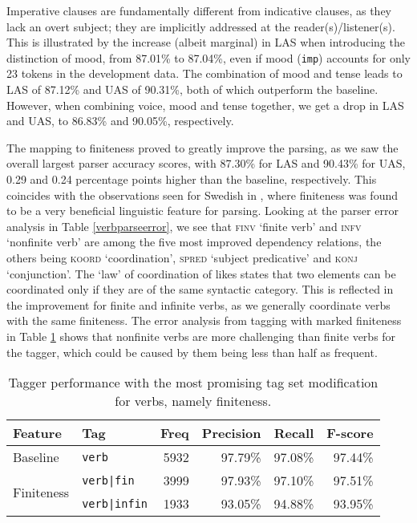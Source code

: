 \documentclass[a4paper,12pt,english]{book}
\begin{document}
Imperative clauses are fundamentally different from indicative clauses, as they
lack an overt subject; they are implicitly addressed at the
reader(s)/listener(s). This is illustrated by the increase (albeit marginal) in
LAS when introducing the distinction of mood, from 87.01\% to 87.04\%, even if
mood (\texttt{imp}) accounts for only 23 tokens in the development data. The
combination of mood and tense leads to LAS of 87.12\% and UAS of 90.31\%, both
of which outperform the baseline. However, when combining voice, mood and tense
together, we get a drop in LAS and UAS, to 86.83\% and 90.05\%, respectively.

The mapping to finiteness proved to greatly improve the parsing, as we saw the
overall largest parser accuracy scores, with 87.30\% for LAS and 90.43\% for
UAS, 0.29 and 0.24 percentage points higher than the baseline, respectively.
This coincides with the observations seen for Swedish in , where
finiteness was found to be a very beneficial linguistic feature for parsing.
Looking at the parser error analysis in Table \ref{verbparseerror}, we see that
\textsc{finv} `finite verb' and \textsc{infv} `nonfinite verb' are among the
five most improved dependency relations, the others being \textsc{koord}
`coordination', \textsc{spred} `subject predicative' and \textsc{konj}
`conjunction'. The `law' of coordination of likes states that two elements can
be coordinated only if they are of the same syntactic category. This is
reflected in the improvement for finite and infinite verbs, as we generally
coordinate verbs with the same finiteness.  The error analysis from tagging
with marked finiteness in Table \ref{verbtagerror} shows that nonfinite verbs
are more challenging than finite verbs for the tagger, which could be caused by
them being less than half as frequent.

\begin{table}
    \centering
    \smaller[0.5]
    \begin{tabular}{@{}llrrrr@{}}
        \toprule
        \textbf{Feature} & \textbf{Tag} & \textbf{Freq} & \textbf{Precision} &
        \textbf{Recall} & \textbf{F-score} \\
        \midrule
        Baseline & \texttt{verb} & 5932 & 97.79\% & 97.08\% & 97.44\% \\
        \midrule
        \multirow{2}{*}{Finiteness}
        & \texttt{verb|fin} & 3999 & 97.93\% & 97.10\% & 97.51\% \\
        & \texttt{verb|infin} & 1933 & 93.05\% & 94.88\% & 93.95\% \\
        \bottomrule
    \end{tabular}
    \caption{Tagger performance with the most promising tag set
        modification for verbs, namely finiteness.}
    \label{verbtagerror}
\end{table}
\end{document}
